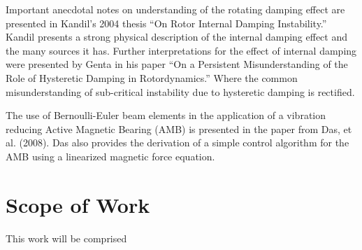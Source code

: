 Important anecdotal notes on understanding of the rotating damping effect are presented in Kandil's 2004\cite{kandil2005rotor} thesis ``On Rotor Internal Damping Instability.'' Kandil presents a strong physical description of the internal damping effect and the many sources it has. Further interpretations for the effect of internal damping were presented by Genta in his paper ``On a Persistent Misunderstanding of the Role of Hysteretic Damping in Rotordynamics.'' Where the common misunderstanding of sub-critical instability due to hysteretic damping is rectified.\par 
The use of Bernoulli-Euler beam elements in the application of a vibration reducing Active Magnetic Bearing (AMB) is presented in the paper from Das, et al. (2008\cite{das2008vibration}). Das also provides the derivation of a simple control algorithm for the AMB using a linearized magnetic force equation.\par
\section{Scope of Work}
This work will be comprised 